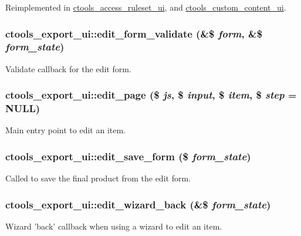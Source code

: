Reimplemented in \hyperlink{classctools__access__ruleset__ui_a662643e9e29c9692d71783bc446ec1ee}{ctools\_\-access\_\-ruleset\_\-ui}, and \hyperlink{classctools__custom__content__ui_a77ac2a98884dcc134470d1e28e01246e}{ctools\_\-custom\_\-content\_\-ui}.\hypertarget{classctools__export__ui_abce40ac42fe560f1e36709f85d86e121}{
\subsubsection[{edit\_\-form\_\-validate}]{\setlength{\rightskip}{0pt plus 5cm}ctools\_\-export\_\-ui::edit\_\-form\_\-validate (\&\$ {\em form}, \/  \&\$ {\em form\_\-state})}}
\label{classctools__export__ui_abce40ac42fe560f1e36709f85d86e121}
Validate callback for the edit form. \hypertarget{classctools__export__ui_a150ff1f0729f0a9313119dc528bbd9fc}{
\subsubsection[{edit\_\-page}]{\setlength{\rightskip}{0pt plus 5cm}ctools\_\-export\_\-ui::edit\_\-page (\$ {\em js}, \/  \$ {\em input}, \/  \$ {\em item}, \/  \$ {\em step} = {\ttfamily NULL})}}
\label{classctools__export__ui_a150ff1f0729f0a9313119dc528bbd9fc}
Main entry point to edit an item. \hypertarget{classctools__export__ui_a72e3784bc5b24e469fb1ae51d77025b3}{
\subsubsection[{edit\_\-save\_\-form}]{\setlength{\rightskip}{0pt plus 5cm}ctools\_\-export\_\-ui::edit\_\-save\_\-form (\$ {\em form\_\-state})}}
\label{classctools__export__ui_a72e3784bc5b24e469fb1ae51d77025b3}
Called to save the final product from the edit form. \hypertarget{classctools__export__ui_a9e27991486cb30aa689eb12d215bb22b}{
\subsubsection[{edit\_\-wizard\_\-back}]{\setlength{\rightskip}{0pt plus 5cm}ctools\_\-export\_\-ui::edit\_\-wizard\_\-back (\&\$ {\em form\_\-state})}}
\label{classctools__export__ui_a9e27991486cb30aa689eb12d215bb22b}
Wizard 'back' callback when using a wizard to edit an item.

